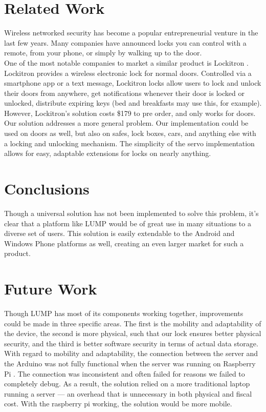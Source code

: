 \documentclass[10pt]{article}
\begin{document}
\begin{multicols}{2}
\section{Related Work}
Wireless networked security has become a popular entrepreneurial venture in the last few years. Many companies have announced locks you can control with a remote, from your phone, or simply by walking up to the door. \\

One of the most notable companies to market a similar product is Lockitron \cite{lockitron}. Lockitron provides a wireless electronic lock for normal doors. Controlled via a smartphone app or a text message, Lockitron locks allow users to lock and unlock their doors from anywhere, get notifications whenever their door is locked or unlocked, distribute expiring keys (bed and breakfasts may use this, for example). \\

However, Lockitron's solution costs \$179 to pre order, and only works for doors. Our solution addresses a more general problem. Our implementation could be used on doors as well, but also on safes, lock boxes, cars, and anything else with a locking and unlocking mechanism. The simplicity of the servo implementation allows for easy, adaptable extensions for locks on nearly anything.\\

\section{Conclusions}
Though a universal solution has not been implemented to solve this problem, it's clear that a platform like LUMP would be of great use in many situations to a diverse set of users. This solution is easily extendable to the Android and Windows Phone platforms as well, creating an even larger market for such a product. 

\section{Future Work}
Though LUMP has most of its components working together, improvements could be made in three specific areas. The first is the mobility and adaptability of the device, the second is more physical, such that our lock ensures better physical security, and the third is better software security in terms of actual data storage.\\

With regard to mobility and adaptability, the connection between the server and the Arduino was not fully functional when the server was running on Raspberry Pi \cite{breakfastserialissue}. The connection was inconsistent and often failed for reasons we failed to completely debug. As a result, the solution relied on a more traditional laptop running a server --- an overhead that is unnecessary in both physical and fiscal cost. With the raspberry pi working, the solution would be more mobile.\\


\end{multicols}
\end{document}
